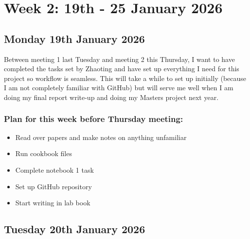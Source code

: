 \section{Week 2: 19th - 25 January 2026}

\subsection{Monday 19th January 2026}

Between meeting 1 last Tuesday and meeting 2 this Thursday, I want to have completed the tasks set by Zhaoting and have set up everything I need for this project so workflow is seamless. This will take a while to set up initially (because I am not completely familiar with GitHub) but will serve me well when I am doing my final report write-up and doing my Masters project next year.

\subsubsection{Plan for this week before Thursday meeting:}

\begin{itemize}
    \item Read over papers and make notes on anything unfamiliar
    \end{itemize}
    \begin{itemize}
    \item Run cookbook files
    \item Complete notebook 1 task
    \item Set up GitHub repository
    \item Start writing in lab book
    \end{itemize}

\subsection{Tuesday 20th January 2026}

